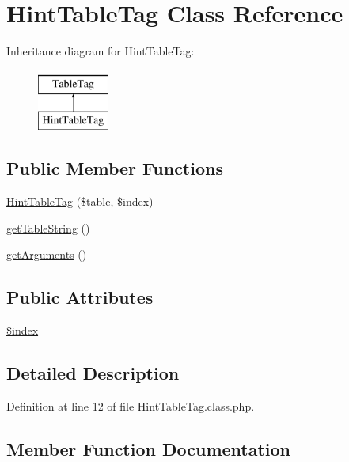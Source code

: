 \hypertarget{classHintTableTag}{}\section{Hint\+Table\+Tag Class Reference}
\label{classHintTableTag}
Inheritance diagram for Hint\+Table\+Tag\+:\begin{figure}[H]
\begin{center}
\leavevmode
\includegraphics[height=2.000000cm]{classHintTableTag}
\end{center}
\end{figure}
\subsection*{Public Member Functions}
\begin{DoxyCompactItemize}
\item 
\hyperlink{classHintTableTag_ab06d4290d105fc2f64d5a4835aed9130}{Hint\+Table\+Tag} (\$table, \$index)
\item 
\hyperlink{classHintTableTag_a39753285a32f1624ab5df5768ce93cdf}{get\+Table\+String} ()
\item 
\hyperlink{classHintTableTag_a774a5f31c9ceb19dd411a92000066741}{get\+Arguments} ()
\end{DoxyCompactItemize}
\subsection*{Public Attributes}
\begin{DoxyCompactItemize}
\item 
\hyperlink{classHintTableTag_aaed2fb461aff0380f77a16df5d04298c}{\$index}
\end{DoxyCompactItemize}


\subsection{Detailed Description}


Definition at line 12 of file Hint\+Table\+Tag.\+class.\+php.



\subsection{Member Function Documentation}
\mbox{\label{classHintTableTag_a774a5f31c9ceb19dd411a92000066741}} 
